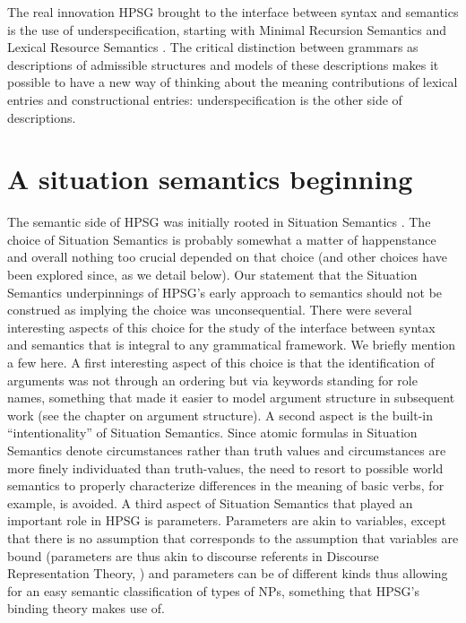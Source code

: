 \documentclass[output=paper]{langsci/langscibook}
\begin{document}
The real innovation HPSG brought to the interface between syntax and semantics is the use of underspecification, starting with Minimal Recursion Semantics \citep{Copestakeetal2001,Copestakeetal2005} and Lexical Resource Semantics \citep{RichterandSailer2001}. The critical distinction between grammars as descriptions of admissible structures and models of these descriptions makes it possible to have a new way of thinking about the meaning contributions of lexical entries and constructional entries: underspecification is the other side of descriptions. 

\section{A situation semantics beginning}

The semantic side of HPSG was initially rooted in Situation Semantics \citep[ch.4]{PollardandSag1987}. The choice of Situation Semantics is probably somewhat a matter of happenstance and overall nothing too crucial depended on that choice (and other choices have been explored since, as we detail below). Our statement that the Situation Semantics underpinnings of HPSG's early approach to semantics should not be construed as implying the choice was unconsequential. There were several interesting aspects of this choice for the study of the interface between syntax and semantics that is integral to any grammatical framework. We briefly mention a few here. A first interesting aspect of this choice is that the identification of arguments was not through an ordering but via keywords standing for role names, something that made it easier to model argument structure in subsequent work (see the chapter on argument structure). A second aspect is the built-in ``intentionality'' of Situation Semantics. Since atomic formulas in Situation Semantics denote circumstances rather than truth values and circumstances are more finely individuated than truth-values, the need to resort to possible world semantics to properly characterize differences in the meaning of basic verbs, for example, is avoided. A third aspect of Situation Semantics that played an important role in HPSG is parameters. Parameters are akin to variables, except that there is no assumption that corresponds to the assumption that variables are bound (parameters are thus akin to discourse referents in Discourse Representation Theory, \citealt{KampandReyle1993}) and parameters can be of different kinds thus allowing for an easy semantic classification of types of NPs, something that HPSG's binding theory makes use of.
\end{document}
